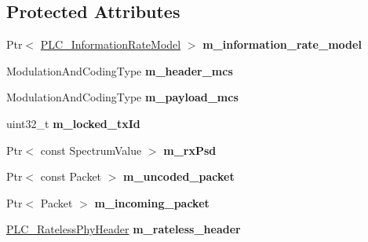 \subsection*{\-Protected \-Attributes}
\begin{DoxyCompactItemize}
\item 
\hypertarget{classns3_1_1PLC__InformationRatePhy_a6cba12da3612f2baf10625d0dd5a8e55}{\-Ptr$<$ \hyperlink{classns3_1_1PLC__InformationRateModel}{\-P\-L\-C\-\_\-\-Information\-Rate\-Model} $>$ {\bfseries m\-\_\-information\-\_\-rate\-\_\-model}}\label{classns3_1_1PLC__InformationRatePhy_a6cba12da3612f2baf10625d0dd5a8e55}

\item 
\hypertarget{classns3_1_1PLC__InformationRatePhy_a094fc00df54b934a22cd73b40a6de7fb}{\-Modulation\-And\-Coding\-Type {\bfseries m\-\_\-header\-\_\-mcs}}\label{classns3_1_1PLC__InformationRatePhy_a094fc00df54b934a22cd73b40a6de7fb}

\item 
\hypertarget{classns3_1_1PLC__InformationRatePhy_a06c4f6fd00f2943b53a1eabe57fffe52}{\-Modulation\-And\-Coding\-Type {\bfseries m\-\_\-payload\-\_\-mcs}}\label{classns3_1_1PLC__InformationRatePhy_a06c4f6fd00f2943b53a1eabe57fffe52}

\item 
\hypertarget{classns3_1_1PLC__InformationRatePhy_aae8894eb143b855da04062069150b0d9}{uint32\-\_\-t {\bfseries m\-\_\-locked\-\_\-tx\-Id}}\label{classns3_1_1PLC__InformationRatePhy_aae8894eb143b855da04062069150b0d9}

\item 
\hypertarget{classns3_1_1PLC__InformationRatePhy_a3be2597b31d3e7a272ec51e6329728b7}{\-Ptr$<$ const \-Spectrum\-Value $>$ {\bfseries m\-\_\-rx\-Psd}}\label{classns3_1_1PLC__InformationRatePhy_a3be2597b31d3e7a272ec51e6329728b7}

\item 
\hypertarget{classns3_1_1PLC__InformationRatePhy_a2759b5176640b092a01e0b939693342a}{\-Ptr$<$ const \-Packet $>$ {\bfseries m\-\_\-uncoded\-\_\-packet}}\label{classns3_1_1PLC__InformationRatePhy_a2759b5176640b092a01e0b939693342a}

\item 
\hypertarget{classns3_1_1PLC__InformationRatePhy_a37f18206753fc41652a6daa2087a5104}{\-Ptr$<$ \-Packet $>$ {\bfseries m\-\_\-incoming\-\_\-packet}}\label{classns3_1_1PLC__InformationRatePhy_a37f18206753fc41652a6daa2087a5104}

\item 
\hypertarget{classns3_1_1PLC__InformationRatePhy_a912b37918ef0f3beadd9d2b0779d8e41}{\hyperlink{classns3_1_1PLC__RatelessPhyHeader}{\-P\-L\-C\-\_\-\-Rateless\-Phy\-Header} {\bfseries m\-\_\-rateless\-\_\-header}}\label{classns3_1_1PLC__InformationRatePhy_a912b37918ef0f3beadd9d2b0779d8e41}


\end{DoxyCompactItemize}
